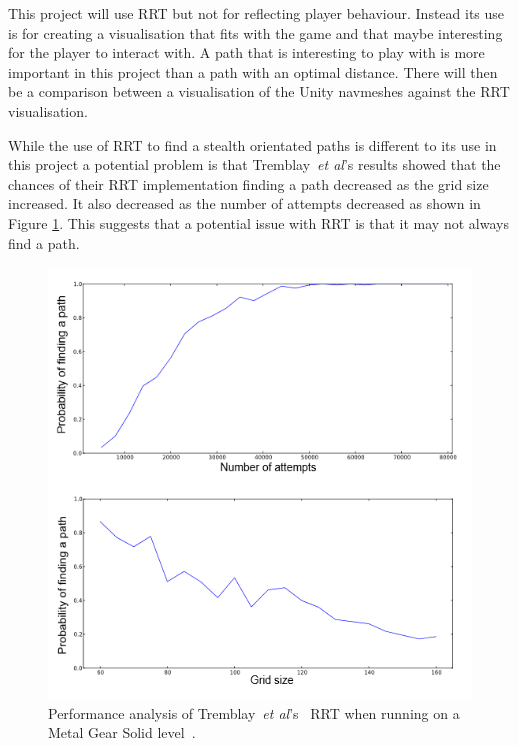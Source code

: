 \documentclass[journal]{IEEEtran}
\begin{document}
This project will use RRT but not for reflecting player behaviour.  Instead its use is for creating a visualisation that fits with the game and that maybe interesting for the player to interact with. A path that is interesting to play with is more important in this project than a path with an optimal distance. There will then be a comparison between a visualisation of the Unity navmeshes against the RRT visualisation.

While the use of RRT to find a stealth orientated paths is different to its use in this project a potential problem is that Tremblay~\textit{et al}'s results showed that the chances of their RRT implementation finding a path decreased as the grid size increased. It also decreased as the number of attempts decreased as shown in Figure \ref{TremblayRRT}.  This suggests that a potential issue with RRT is that it may not always find a path.

\begin{figure}[h]
	\includegraphics[width=1.0\linewidth]{Tremblay2013.png}
	\caption{ Performance analysis of Tremblay~\textit{et al}'s~\cite{Tremblay2013} RRT when running on a Metal Gear Solid level~\cite{game:MetalGearSolid}.}
	\label{TremblayRRT}
\end{figure} 
\end{document}

